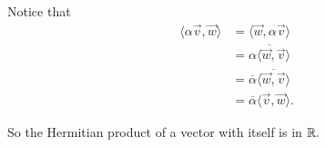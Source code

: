 Notice that 
\begin{align*}
    \langle \alpha \vec{v}, \vec{w} \rangle &= \langle \vec{w}, \alpha \vec{v} \rangle \\
    &= \overline{\alpha \langle \vec{w}, \vec{v} \rangle} \\
    &= \overline{\alpha} \overline{\langle \vec{w}, \vec{v} \rangle} \\
    &= \overline{\alpha} \langle \vec{v}, \vec{w} \rangle.
\end{align*}

So the Hermitian product of a vector with itself is in $\mathbb R.$
\newpage